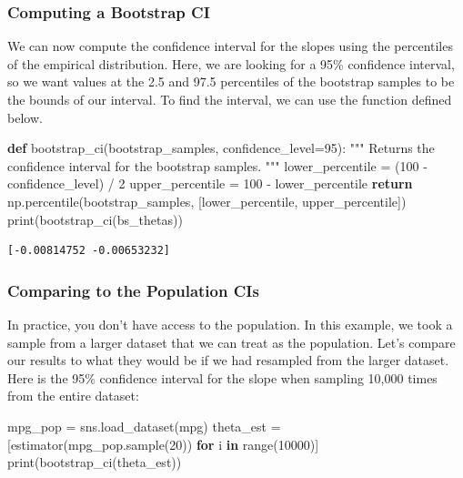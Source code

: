 \documentclass[
  letterpaper,
  DIV=11,
  numbers=noendperiod]{scrreprt}
\newenvironment{Shaded}{\begin{snugshade}}{\end{snugshade}}
\newcommand{\BuiltInTok}[1]{\textcolor[rgb]{0.00,0.23,0.31}{#1}}
\newcommand{\CommentTok}[1]{\textcolor[rgb]{0.37,0.37,0.37}{#1}}
\newcommand{\ControlFlowTok}[1]{\textcolor[rgb]{0.00,0.23,0.31}{\textbf{#1}}}
\newcommand{\DecValTok}[1]{\textcolor[rgb]{0.68,0.00,0.00}{#1}}
\newcommand{\KeywordTok}[1]{\textcolor[rgb]{0.00,0.23,0.31}{\textbf{#1}}}
\newcommand{\NormalTok}[1]{\textcolor[rgb]{0.00,0.23,0.31}{#1}}
\newcommand{\OperatorTok}[1]{\textcolor[rgb]{0.37,0.37,0.37}{#1}}
\newcommand{\StringTok}[1]{\textcolor[rgb]{0.13,0.47,0.30}{#1}}
\begin{document}
\subsubsection{Computing a Bootstrap CI}\label{computing-a-bootstrap-ci}

We can now compute the confidence interval for the slopes using the
percentiles of the empirical distribution. Here, we are looking for a
95\% confidence interval, so we want values at the 2.5 and 97.5
percentiles of the bootstrap samples to be the bounds of our interval.
To find the interval, we can use the function defined below.

\begin{Shaded}
\begin{Highlighting}[]
\KeywordTok{def}\NormalTok{ bootstrap\_ci(bootstrap\_samples, confidence\_level}\OperatorTok{=}\DecValTok{95}\NormalTok{):}
    \CommentTok{"""}
\CommentTok{    Returns the confidence interval for the bootstrap samples.}
\CommentTok{    """}
\NormalTok{    lower\_percentile }\OperatorTok{=}\NormalTok{ (}\DecValTok{100} \OperatorTok{{-}}\NormalTok{ confidence\_level) }\OperatorTok{/} \DecValTok{2}
\NormalTok{    upper\_percentile }\OperatorTok{=} \DecValTok{100} \OperatorTok{{-}}\NormalTok{ lower\_percentile}
    \ControlFlowTok{return}\NormalTok{ np.percentile(bootstrap\_samples, [lower\_percentile, upper\_percentile])}
\BuiltInTok{print}\NormalTok{(bootstrap\_ci(bs\_thetas))}
\end{Highlighting}
\end{Shaded}

\begin{verbatim}
[-0.00814752 -0.00653232]
\end{verbatim}

\subsubsection{Comparing to the Population
CIs}\label{comparing-to-the-population-cis}

In practice, you don't have access to the population. In this example,
we took a sample from a larger dataset that we can treat as the
population. Let's compare our results to what they would be if we had
resampled from the larger dataset. Here is the 95\% confidence interval
for the slope when sampling 10,000 times from the entire dataset:

\begin{Shaded}
\begin{Highlighting}[]
\NormalTok{mpg\_pop }\OperatorTok{=}\NormalTok{ sns.load\_dataset(}\StringTok{\textquotesingle{}mpg\textquotesingle{}}\NormalTok{)}
\NormalTok{theta\_est }\OperatorTok{=}\NormalTok{ [estimator(mpg\_pop.sample(}\DecValTok{20}\NormalTok{)) }\ControlFlowTok{for}\NormalTok{ i }\KeywordTok{in} \BuiltInTok{range}\NormalTok{(}\DecValTok{10000}\NormalTok{)]}
\BuiltInTok{print}\NormalTok{(bootstrap\_ci(theta\_est))}
\end{Highlighting}
\end{Shaded}
\end{document}
